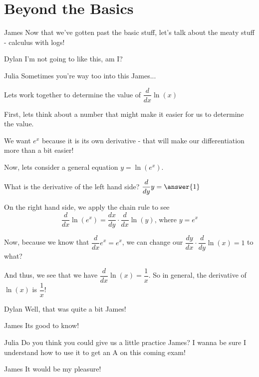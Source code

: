 \documentclass{ximera}
\begin{document}
\section{Beyond the Basics}
\begin{dialogue}
\item[James] Now that we've gotten past the basic stuff, let's talk about the meaty stuff - calculus with logs!
\item[Dylan] I'm not going to like this, am I?
\item[Julia] Sometimes you're way too into this James...
\end{dialogue}
\begin{example}
Lets work together to determine the value of $\dfrac{d}{dx}\ln(x)$
\begin{explanation}
First, lets think about a number that might make it easier for us to determine the value.
\begin{multipleChoice}
\choice{$\pi$}
\end{multipleChoice}
\begin{feedback}
We want $e^x$ because it is its own derivative - that will make our differentiation more than a bit easier!
\end{feedback}

Now, lets consider a general equation $y = \ln(e^x)$.

What is the derivative of the left hand side?
$\dfrac{d}{dy}y = \answer{1}$

On the right hand side, we apply the chain rule to see $$\dfrac{d}{dx} \ln(e^x) = \dfrac{dx}{dy} \cdot \dfrac{d}{dx}\ln(y) \text{, where } y = e^x$$

Now, because we know that $\dfrac{d}{dx}e^x = e^x$, we can change our $\dfrac{dy}{dx}\cdot\dfrac{d}{dy}\ln(x) = 1$ to what?

\begin{multipleChoice}
\end{multipleChoice}
\begin{feedback}
And thus, we see that we have $\dfrac{d}{dx}\ln(x) = \dfrac{1}{x}$. So in general, the derivative of $\ln(x)$ is $\dfrac{1}{x}$!
\end{feedback}
\end{explanation}
\end{example}

\begin{dialogue}
\item[Dylan] Well, that was quite a bit James!
\item[James] Its good to know!
\item[Julia] Do you think you could give us a little practice James? I wanna be sure I understand how to use it to get an A on this coming exam!
\item[James] It would be my pleasure!
\end{dialogue}
\end{document}
